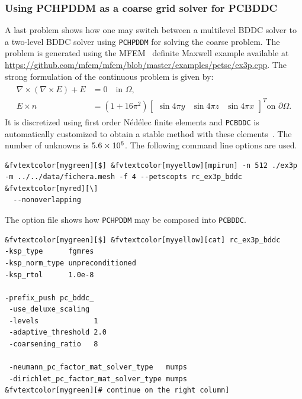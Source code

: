 \documentclass[3p,11pt]{elsarticle}
\newcommand{\pk}[1]{\texttt{#1}}
\begin{document}
    \subsubsection{Using PCHPDDM as a coarse grid solver for PCBDDC\label{sec:bddc}}
A last problem shows how one may switch between a multilevel
BDDC solver to a two-level BDDC solver using \pk{PCHPDDM} for solving the
coarse problem. The problem is generated using the MFEM~\cite{anderson2019mfem}
definite Maxwell example available at \url{https://github.com/mfem/mfem/blob/master/examples/petsc/ex3p.cpp}.
The strong formulation of the continuous problem is given by:
\begin{align}
	\label{eq:maxwell}
	\begin{split}
        \nabla \times (\nabla \times E) + E	&= 0	\quad \text{in } \Omega,\\
        E \times n					&= (1+16\pi^2)\begin{bmatrix} \sin{4\pi y}&
        \sin{4\pi z}&\sin{4\pi x} \end{bmatrix}^T \text{on } \partial \Omega.
	\end{split}
\end{align}
It is discretized using first order Nédélec finite elements and \pk{PCBDDC}
is automatically customized to obtain a stable method with these
elements~\cite{zampini2017balancing}. The number of unknowns is $\pgfmathprintnumber{5.6} \times 10^6$.
The following command line options are used. \\[-4pt]
\begin{Verbatim}[fontsize=\footnotesize,frame=single,framerule=0.1mm,commandchars=&\[\]]
&fvtextcolor[mygreen][$] &fvtextcolor[myyellow][mpirun] -n 512 ./ex3p -m ../../data/fichera.mesh -f 4 --petscopts rc_ex3p_bddc      &fvtextcolor[myred][\]
  --nonoverlapping
\end{Verbatim}
The option file shows how \pk{PCHPDDM} may be composed into \pk{PCBDDC}. \\[-4pt]
\begin{minipage}[t]{0.565\textwidth}
\begin{Verbatim}[fontsize=\footnotesize,frame=single,framerule=0.1mm,commandchars=&\[\]]
&fvtextcolor[mygreen][$] &fvtextcolor[myyellow][cat] rc_ex3p_bddc
-ksp_type      fgmres
-ksp_norm_type unpreconditioned
-ksp_rtol      1.0e-8

-prefix_push pc_bddc_
 -use_deluxe_scaling
 -levels             1
 -adaptive_threshold 2.0
 -coarsening_ratio   8

 -neumann_pc_factor_mat_solver_type   mumps
 -dirichlet_pc_factor_mat_solver_type mumps
&fvtextcolor[mygreen][# continue on the right column]
\end{Verbatim}
\end{minipage}
\end{document}
